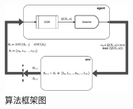 \begin{figure}[hptb]
    \centering
    \includegraphics[width=0.49\textwidth]{算法框架图.pdf}
    \caption{算法框架图}
    \label{fig:算法框架图}
\end{figure}